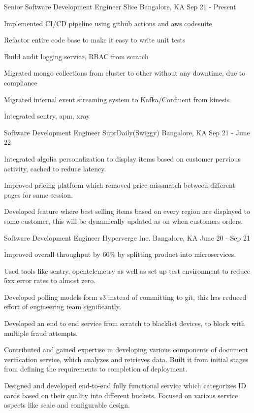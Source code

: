 \begin{cventries}
  \cventry
    {Senior Software Development Engineer}
    {Slice}
    {Bangalore, KA}
    {Sep 21 - Present}
    {
      \begin{cvitems}
        \item {Implemented CI/CD pipeline using github actions and aws codesuite}
        \item {Refactor entire code base to make it easy to write unit tests}
        \item {Build audit logging service, RBAC from scratch}
        \item {Migrated mongo collections from cluster to other without any downtime, due to compliance}
        \item {Migrated internal event streaming system to Kafka/Confluent from kinesis}
        \item {Integrated sentry, apm, xray}
      \end{cvitems}
    }
  
  \cventry
    {Software Development Engineer}
    {SuprDaily(Swiggy)}
    {Bangalore, KA}
    {Sep 21 - June 22}
    {
      \begin{cvitems}
        \item {Integrated algolia personalization to display items based on customer pervious activity, cached to reduce latency.}
        \item {Improved pricing platform which removed price missmatch between different pages for same session.}
        \item {Developed feature where best selling items based on every region are displayed to some customer, this will be dynamically updated as on when customers orders.}
      \end{cvitems}
    }
  
  \cventry
    {Software Development Engineer}
    {Hyperverge Inc.}
    {Bangalore, KA}
    {June 20 - Sep 21}
    {
      \begin{cvitems}
        \item {Improved overall throughput by 60\% by splitting product into microservices.}
        \item {Used tools like sentry, opentelemetry as well as set up test environment to reduce 5xx error rates to almost zero.}
        \item {Developed polling models form s3 instead of committing to git, this has reduced effort of engineering team significantly.}
        \item {Developed an end to end service from scratch to blacklist devices, to block with multiple fraud attempts.}
        \item {Contributed and gained expertise in developing various components of document verification service, which analyzes and retrieves data. Built it from initial stages from defining the requirements to completion of deployment.}
        \item {Designed and developed end-to-end fully functional service which categorizes ID cards based on their quality into different buckets. Focused on various service aspects like scale and configurable design.}
      \end{cvitems}
    }


\end{cventries}
